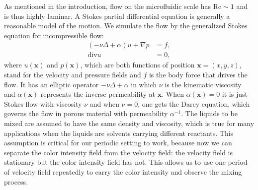 As mentioned in the introduction, flow on the microfluidic
scale has $\text{Re}\sim 1$ and is thus highly laminar. A Stokes partial
differential equation is generally a reasonable model of the motion.
We simulate the flow by the generalized Stokes equation for
incompressible flow:
\begin{subequations}
  \label{stokes}
  \begin{align}
    \label{stokes1}
    ( -\nu\Delta + \alpha)u
    + \nabla p &= f, \\
    \label{stokes2}
    \mbox{div} u &= 0,
  \end{align}
\end{subequations}
where $u(\mathbf{x})$ and $p(\mathbf{x})$, which are both functions of
position $\mathbf{x}=(x,y,z)$, stand for the velocity and pressure
fields and $f$ is the body force that drives the flow. It has an
elliptic operator $-\nu\Delta + \alpha $ in which $\nu$ is the
kinematic viscosity and $\alpha(\mathbf{x})$ represents the inverse
permeability at $\mathbf{x}$. When $\alpha(\mathbf{x}) = 0 $ it is
just Stokes flow with viscosity $\nu$ and when $\nu=0$, one gets the
Darcy equation, which governs the flow in porous material with
permeability $\alpha^{-1}$. The liquids to be mixed are assumed to
have the same density and viscosity, which is true for
many applications when the liquids are solvents carrying different
reactants. This assumption is critical for our periodic setting 
to work, because now we can separate the color intensity field from 
the velocity field: the velocity field is stationary but the color 
intensity field has not. This allows us to use one period of velocity 
field repeatedly to carry the color intensity and observe the mixing process. 

 



